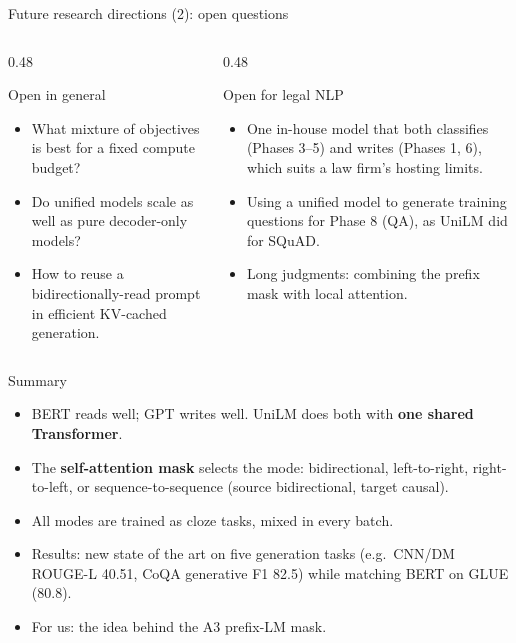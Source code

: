 \documentclass[aspectratio=169,11pt]{beamer}
\begin{document}
\begin{frame}{Future research directions (2): open questions}
  \begin{columns}[T]
    \begin{column}{0.48\textwidth}
      \begin{block}{Open in general}
        \small
        \begin{itemize}
          \item What mixture of objectives is best for a fixed compute budget?
          \item Do unified models scale as well as pure decoder-only models?
          \item How to reuse a bidirectionally-read prompt in efficient KV-cached generation.
        \end{itemize}
      \end{block}
    \end{column}
    \begin{column}{0.48\textwidth}
      \begin{exampleblock}{Open for legal NLP}
        \small
        \begin{itemize}
          \item One in-house model that both classifies (Phases 3--5) and writes (Phases 1, 6), which suits a law firm's hosting limits.
          \item Using a unified model to generate training questions for Phase 8 (QA), as UniLM did for SQuAD.
          \item Long judgments: combining the prefix mask with local attention.
        \end{itemize}
      \end{exampleblock}
    \end{column}
  \end{columns}
\end{frame}

\begin{frame}{Summary}
  \begin{itemize}
    \item BERT reads well; GPT writes well. UniLM does both with \textbf{one shared Transformer}.
    \item The \textbf{self-attention mask} selects the mode: bidirectional, left-to-right, right-to-left, or sequence-to-sequence (source bidirectional, target causal).
    \item All modes are trained as cloze tasks, mixed in every batch.
    \item Results: new state of the art on five generation tasks (e.g.\ CNN/DM ROUGE-L 40.51, CoQA generative F1 82.5) while matching BERT on GLUE (80.8).
    \item For us: the idea behind the A3 prefix-LM mask.
  \end{itemize}
\end{frame}
\end{document}
